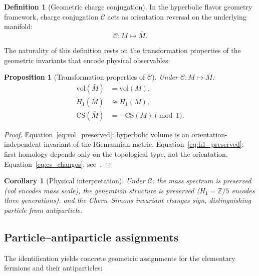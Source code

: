 \documentclass[12pt]{article}
\newtheorem{proposition}[theorem]{Proposition}
\newtheorem{corollary}[theorem]{Corollary}
\theoremstyle{definition}
\newtheorem{definition}[theorem]{Definition}
\begin{document}
\begin{definition}[Geometric charge conjugation]
\label{def:C}
In the hyperbolic flavor geometry framework, charge conjugation
$\mathcal{C}$ acts as orientation reversal on the underlying manifold:
\[
  \mathcal{C}: M \longmapsto \bar{M}.
\]
\end{definition}

The naturality of this definition rests on the transformation properties
of the geometric invariants that encode physical observables:

\begin{proposition}[Transformation properties of $\mathcal{C}$]
\label{prop:transform}
Under $\mathcal{C}: M \mapsto \bar{M}$:
\begin{align}
  \mathrm{vol}(\bar{M}) &= \mathrm{vol}(M),
    \label{eq:vol_preserved} \\
  H_1(\bar{M}) &\cong H_1(M),
    \label{eq:h1_preserved} \\
  \mathrm{CS}(\bar{M}) &= -\mathrm{CS}(M) \pmod{1}.
    \label{eq:cs_changes}
\end{align}
\end{proposition}

\begin{proof}
Equation~\eqref{eq:vol_preserved}: hyperbolic volume is an orientation-
independent invariant of the Riemannian metric.
Equation~\eqref{eq:h1_preserved}: first homology depends only on the
topological type, not the orientation.
Equation~\eqref{eq:cs_changes}: see~\cite{Meyerhoff1987}.
\end{proof}

\begin{corollary}[Physical interpretation]
\label{cor:physics}
Under $\mathcal{C}$: the mass spectrum is preserved
(vol encodes mass scale), the generation structure is preserved
($H_1 = \mathbb{Z}/5$ encodes three generations), and the
Chern--Simons invariant changes sign, distinguishing particle
from antiparticle.
\end{corollary}

\subsection{Particle--antiparticle assignments}

The identification yields concrete geometric assignments for the
elementary fermions and their antiparticles:
\end{document}
